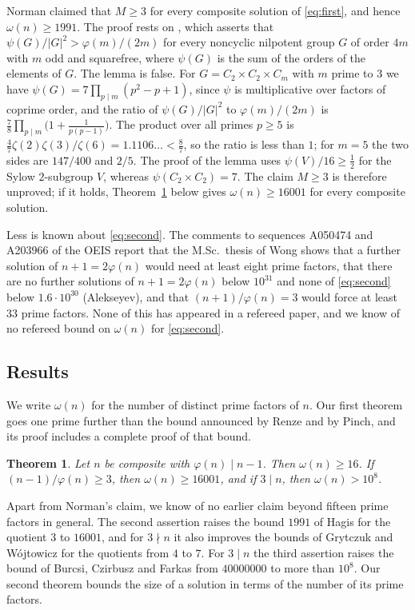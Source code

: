 \documentclass[11pt,reqno]{amsart}
\numberwithin{equation}{section}
\theoremstyle{plain}
\newtheorem{theorem}{Theorem}[section]
\theoremstyle{definition}
\theoremstyle{remark}
\begin{document}
Norman \cite{Nor21} claimed that $M\ge3$ for every composite solution
of \eqref{eq:first}, and hence $\omega(n)\ge1991$. The proof rests on
\cite[Lemma~2.1]{Nor21}, which asserts that
$\psi(G)/|G|^2>\varphi(m)/(2m)$ for every noncyclic nilpotent group
$G$ of order $4m$ with $m$ odd and squarefree, where $\psi(G)$ is the
sum of the orders of the elements of $G$. The lemma is false. For
$G=C_2\times C_2\times C_m$ with $m$ prime to $3$ we have
$\psi(G)=7\prod_{p\mid m}(p^2-p+1)$, since $\psi$ is multiplicative
over factors of coprime order, and the ratio of $\psi(G)/|G|^2$ to
$\varphi(m)/(2m)$ is $\frac78\prod_{p\mid m}\bigl(1+\frac1{p(p-1)}\bigr)$.
The product over all primes $p\ge5$ is
$\frac47\zeta(2)\zeta(3)/\zeta(6)=1.1106\ldots<\frac87$, so the ratio
is less than $1$; for $m=5$ the two sides are $147/400$ and $2/5$. The
proof of the lemma uses $\psi(V)/16\ge\frac12$ for the Sylow
$2$-subgroup $V$, whereas $\psi(C_2\times C_2)=7$. The claim $M\ge3$
is therefore unproved; if it holds, Theorem~\ref{thm:first} below gives
$\omega(n)\ge16001$ for every composite solution.

Less is known about \eqref{eq:second}. The comments to
sequences A050474 and A203966 of the OEIS \cite{OEIS} report that the
M.Sc.\ thesis of Wong \cite{Won97} shows that a further solution of
$n+1=2\varphi(n)$ would need at least eight prime factors, that there
are no further solutions of $n+1=2\varphi(n)$ below $10^{31}$ and none
of \eqref{eq:second} below $1.6\cdot10^{30}$ (Alekseyev), and that
$(n+1)/\varphi(n)=3$ would force at least $33$ prime factors. None of
this has appeared in a refereed paper, and we know of no refereed bound
on $\omega(n)$ for \eqref{eq:second}.

\subsection{Results}
We write $\omega(n)$ for the number of distinct prime factors of $n$.
Our first theorem goes one prime further than the bound announced by
Renze and by Pinch, and its proof includes a complete proof of that
bound.

\begin{theorem}\label{thm:first}
Let $n$ be composite with $\varphi(n)\mid n-1$. Then $\omega(n)\ge16$.
If $(n-1)/\varphi(n)\ge3$, then $\omega(n)\ge16001$, and if $3\mid n$,
then $\omega(n)>10^8$.
\end{theorem}

Apart from Norman's claim, we know of no earlier claim beyond fifteen
prime factors in general. The second assertion raises the bound $1991$
of Hagis for the quotient $3$ to $16001$, and for $3\nmid n$ it also
improves the bounds of Grytczuk and W\'ojtowicz for the quotients from
$4$ to $7$. For $3\mid n$ the third
assertion raises the bound of Burcsi, Czirbusz and Farkas from
$40000000$ to more than $10^8$. Our second theorem bounds the size of a solution in terms of the
number of its prime factors.
\end{document}
